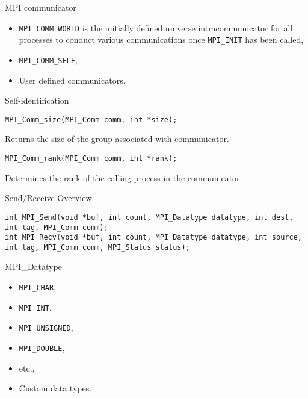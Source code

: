 \begin{frame}{MPI communicator}

\begin{itemize}
	\item \texttt{MPI_COMM_WORLD} is the initially defined universe intracommunicator for all processes to conduct various communications once \texttt{MPI_INIT} has been called,
	\item \texttt{MPI_COMM_SELF},
	\item User defined communicators.
\end{itemize}

\end{frame}

\begin{frame}[fragile]{Self-identification}

\begin{lstlisting}
MPI_Comm_size(MPI_Comm comm, int *size);
\end{lstlisting}

Returns the size of the group associated with communicator.

\vfill

\begin{lstlisting}
MPI_Comm_rank(MPI_Comm comm, int *rank);
\end{lstlisting}

Determines the rank of the calling process in the communicator.

\end{frame}

\begin{frame}[fragile]{Send/Receive Overview}

\begin{lstlisting}
int MPI_Send(void *buf, int count, MPI_Datatype datatype, int dest, int tag, MPI_Comm comm);
int MPI_Recv(void *buf, int count, MPI_Datatype datatype, int source, int tag, MPI_Comm comm, MPI_Status status);
\end{lstlisting}

\end{frame}

\begin{frame}{MPI_Datatype}

\begin{itemize}
	\item \texttt{MPI_CHAR},
	\item \texttt{MPI_INT},
	\item \texttt{MPI_UNSIGNED},
	\item \texttt{MPI_DOUBLE},
	\item etc.,
	\item Custom data types.
\end{itemize}

\end{frame}

